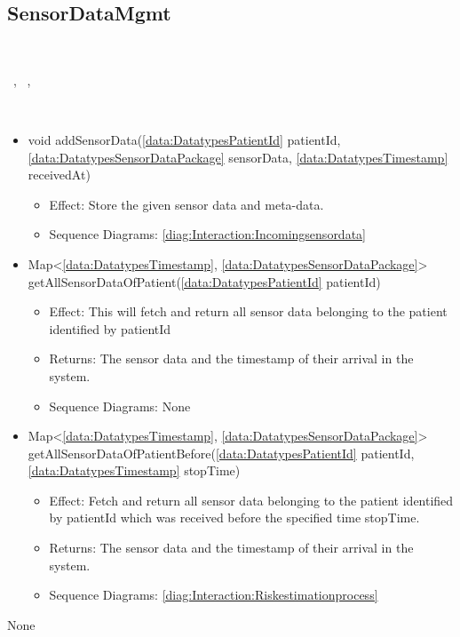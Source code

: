  \subsection{SensorDataMgmt}\label{int:InterfacesSensorDataMgmt}
    \begin{description}
      \item[Provided by:] \iconcomponent{}~
      \item[Required by:] \iconcomponent{}~, \iconcomponent{}~, \iconcomponent{}~ 
      \item[Operations:] ~
    \begin{itemize}[noitemsep,nolistsep,leftmargin=-.25cm]
      \item \textsf{void addSensorData(\ref{data:DatatypesPatientId} patientId, \ref{data:DatatypesSensorDataPackage} sensorData, \ref{data:DatatypesTimestamp} receivedAt)}
        \begin{itemize}[noitemsep,nolistsep]
           \item Effect: Store the given sensor data and meta-data. 
           \item Sequence Diagrams: \cref{diag:Interaction:Incomingsensordata}
        \end{itemize}
      \item \textsf{Map\textless{}\ref{data:DatatypesTimestamp}, \ref{data:DatatypesSensorDataPackage}\textgreater{} getAllSensorDataOfPatient(\ref{data:DatatypesPatientId} patientId)}
        \begin{itemize}[noitemsep,nolistsep]
           \item Effect: This will fetch and return all sensor data belonging to the patient identified by patientId 
           \item Returns: The sensor data and the timestamp of their arrival in the system.
           \item Sequence Diagrams: None
        \end{itemize}
      \item \textsf{Map\textless{}\ref{data:DatatypesTimestamp}, \ref{data:DatatypesSensorDataPackage}\textgreater{} getAllSensorDataOfPatientBefore(\ref{data:DatatypesPatientId} patientId, \ref{data:DatatypesTimestamp} stopTime)}
        \begin{itemize}[noitemsep,nolistsep]
           \item Effect: Fetch and return all sensor data belonging to the patient identified by patientId which was received before the specified time stopTime. 
           \item Returns: The sensor data and the timestamp of their arrival in the system.
           \item Sequence Diagrams: \cref{diag:Interaction:Riskestimationprocess}
        \end{itemize}
    \end{itemize}
      \item[Diagrams:] None
    \end{description}

